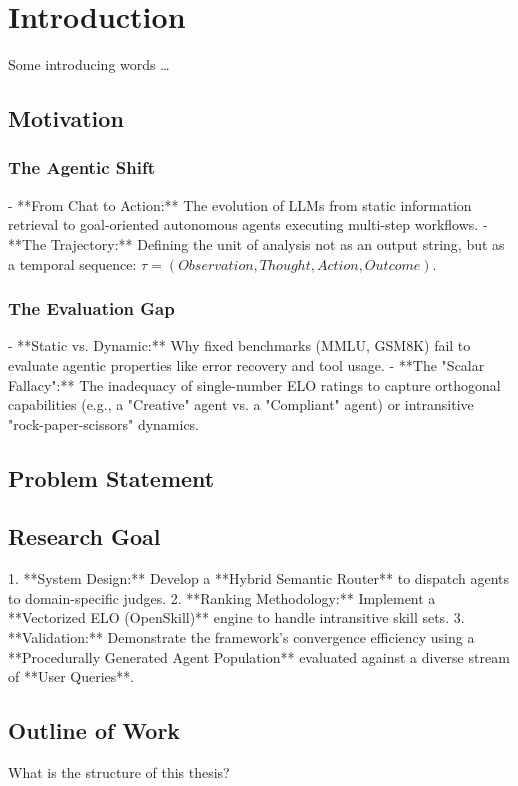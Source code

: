 \chapter{Introduction}\label{ch:introduction}
Some introducing words \dots


\section{Motivation}\label{sec:motivation}

\subsection{The Agentic Shift}\label{subsec:the-agentic-shift}
- **From Chat to Action:** The evolution of LLMs from static information retrieval to goal-oriented autonomous agents executing multi-step workflows.
- **The Trajectory:** Defining the unit of analysis not as an output string, but as a temporal sequence: $\tau = (Observation, Thought, Action, Outcome)$.

\subsection{The Evaluation Gap}\label{subsec:the-evaluation-gap}
- **Static vs. Dynamic:** Why fixed benchmarks (MMLU, GSM8K) fail to evaluate agentic properties like error recovery and tool usage.
- **The "Scalar Fallacy":** The inadequacy of single-number ELO ratings to capture orthogonal capabilities (e.g., a "Creative" agent vs. a "Compliant" agent) or intransitive "rock-paper-scissors" dynamics.

\section{Problem Statement}\label{sec:problem-statement}


\section{Research Goal}\label{sec:research-goal}
1. **System Design:** Develop a **Hybrid Semantic Router** to dispatch agents to domain-specific judges.
2. **Ranking Methodology:** Implement a **Vectorized ELO (OpenSkill)** engine to handle intransitive skill sets.
3. **Validation:** Demonstrate the framework's convergence efficiency using a **Procedurally Generated Agent Population** evaluated against a diverse stream of **User Queries**.

\section{Outline of Work}\label{sec:outline-of-work}
What is the structure of this thesis?